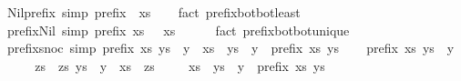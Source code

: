 \begin{isabellebody}
%
\isamarkuptrue%
%
\endisatagdocument
{\isafolddocument}%
%
\isadelimdocument
%
\endisadelimdocument
{}\isamarkupfalse%
\ Nil{\isacharunderscore}prefix\ {\isacharbrackleft}simp{\isacharbrackright}{\isacharcolon}\ {\isachardoublequoteopen}prefix\ {\isacharbrackleft}{\isacharbrackright}\ xs{\isachardoublequoteclose}\isanewline
%
\isadelimproof
\ \ %
\endisadelimproof
%
\isatagproof
{}\isamarkupfalse%
\ {\isacharparenleft}fact\ prefix{\isacharunderscore}bot{\isachardot}bot{\isacharunderscore}least{\isacharparenright}%
\endisatagproof
{\isafoldproof}%
%
\isadelimproof
\isanewline
%
\endisadelimproof
\isanewline
\isanewline
{}\isamarkupfalse%
\ prefix{\isacharunderscore}Nil\ {\isacharbrackleft}simp{\isacharbrackright}{\isacharcolon}\ {\isachardoublequoteopen}{\isacharparenleft}prefix\ xs\ {\isacharbrackleft}{\isacharbrackright}{\isacharparenright}\ {\isacharequal}\ {\isacharparenleft}xs\ {\isacharequal}\ {\isacharbrackleft}{\isacharbrackright}{\isacharparenright}{\isachardoublequoteclose}\isanewline
%
\isadelimproof
\ \ %
\endisadelimproof
%
\isatagproof
{}\isamarkupfalse%
\ {\isacharparenleft}fact\ prefix{\isacharunderscore}bot{\isachardot}bot{\isacharunderscore}unique{\isacharparenright}%
\endisatagproof
{\isafoldproof}%
%
\isadelimproof
\isanewline
%
\endisadelimproof
\isanewline
{}\isamarkupfalse%
\ prefix{\isacharunderscore}snoc\ {\isacharbrackleft}simp{\isacharbrackright}{\isacharcolon}\ {\isachardoublequoteopen}prefix\ xs\ {\isacharparenleft}ys\ {\isacharat}\ {\isacharbrackleft}y{\isacharbrackright}{\isacharparenright}\ {\isasymlongleftrightarrow}\ xs\ {\isacharequal}\ ys\ {\isacharat}\ {\isacharbrackleft}y{\isacharbrackright}\ {\isasymor}\ prefix\ xs\ ys{\isachardoublequoteclose}\isanewline
%
\isadelimproof
%
\endisadelimproof
%
\isatagproof
{}\isamarkupfalse%
\isanewline
\ \ \isamarkupfalse%
\ {\isachardoublequoteopen}prefix\ xs\ {\isacharparenleft}ys\ {\isacharat}\ {\isacharbrackleft}y{\isacharbrackright}{\isacharparenright}{\isachardoublequoteclose}\isanewline
\ \ \isamarkupfalse%
\ \isamarkupfalse%
\ zs\ \ zs{\isacharcolon}\ {\isachardoublequoteopen}ys\ {\isacharat}\ {\isacharbrackleft}y{\isacharbrackright}\ {\isacharequal}\ xs\ {\isacharat}\ zs{\isachardoublequoteclose}\ \isacommand{{\isachardot}{\isachardot}}\isamarkupfalse%
\isanewline
\ \ \isamarkupfalse%
\ {\isachardoublequoteopen}xs\ {\isacharequal}\ ys\ {\isacharat}\ {\isacharbrackleft}y{\isacharbrackright}\ {\isasymor}\ prefix\ xs\ ys{\isachardoublequoteclose}\isanewline

\end{isabellebody}
